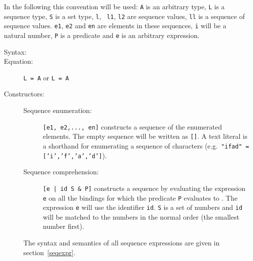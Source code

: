 \documentclass[\pformat,12pt]{article}
\begin{document}
In the following this convention will be used: {\tt A} is an arbitrary
type, {\tt L} is a sequence type, {\tt S} is a set type, {\tt l}, {\tt
  l1}, {\tt l2} are sequence values, {\tt ll} is a sequence of
sequence values.  {\tt e1}, {\tt e2} and {\tt en} are elements in
these sequences, {\tt i} will be a natural number, {\tt P} is a
predicate and {\tt e} is an arbitrary expression.

\begin{description}
\item[Syntax:] 


  
\item[Equation:] {\tt L =  A} or {\tt L =  A}%


\item[Constructors:] \mbox{}

  \begin{description}
  \item[Sequence enumeration:] \verb+[e1, e2,..., en]+ constructs a
    sequence of the enumerated elements. The empty sequence will be written
    as \verb+[]+.  A text literal is a shorthand for enumerating a sequence
    of characters (e.g.\ {\tt "ifad" = ['i','f','a','d']}).

  \item[Sequence comprehension:] {\tt [e | id  S \& P]}
    constructs a sequence by evaluating the expression {\tt e} on all the
    bindings for which the predicate {\tt P} evaluates to . The
    expression {\tt e} will use the identifier {\tt id}. {\tt S} is a set
    of numbers and {\tt id} will be matched to the numbers in the
    normal order (the smallest number first).
  \end{description}
  The syntax and semantics of all sequence expressions are given in
  section~\ref{seqexpr}.%


\end{description}
\end{document}
